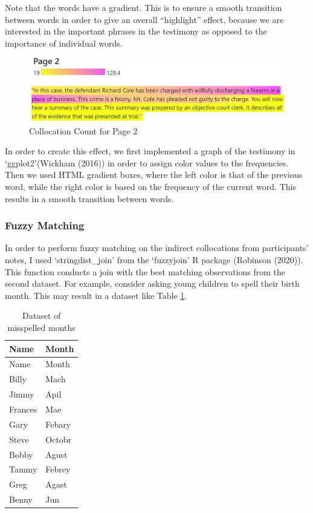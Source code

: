 \documentclass[print]{nuthesis}
\begin{document}
Note that the words have a gradient.
This is to ensure a smooth transition between words in order to give an overall ``highlight'' effect, because we are interested in the important phrases in the testimony as opposed to the importance of individual words.

\begin{figure}

{\centering \includegraphics[width=\linewidth]{images/collocationanalysis} 

}

\caption{Collocation Count for Page 2}\label{fig:highlights}
\end{figure}

In order to create this effect, we first implemented a graph of the testimony in `ggplot2'(Wickham (2016)) in order to assign color values to the frequencies.
Then we used HTML gradient boxes, where the left color is that of the previous word, while the right color is based on the frequency of the current word.
This results in a smooth transition between words.

\hypertarget{fuzzy-matching}{%
\subsubsection{Fuzzy Matching}\label{fuzzy-matching}}

In order to perform fuzzy matching on the indirect collocations from participants' notes, I used `stringdist\_join' from the `fuzzyjoin' R package (Robinson (2020)).
This function conducts a join with the best matching observations from the second dataset.
For example, consider asking young children to spell their birth month.
This may result in a dataset like Table \ref{tab:months}.

\begin{longtable}[]{@{}ll@{}}
\caption{Dataset of misspelled months \label{tab:months}}\tabularnewline
\toprule\noalign{}
Name & Month \\
\midrule\noalign{}
\endfirsthead
\toprule\noalign{}
Name & Month \\
\midrule\noalign{}
\endhead
\bottomrule\noalign{}
\endlastfoot
Billy & Mach \\
Jimmy & Apil \\
Frances & Mae \\
Gary & Febary \\
Steve & Octobr \\
Bobby & Agust \\
Tammy & Febrey \\
Greg & Agast \\
Benny & Jun \\
\end{longtable}
\end{document}
